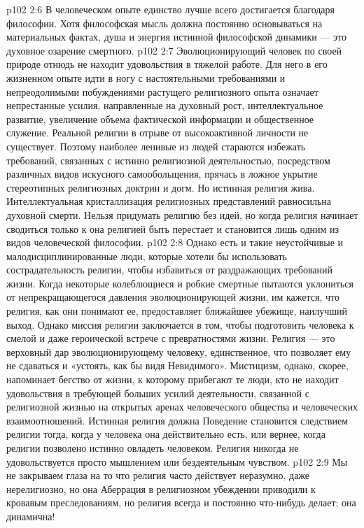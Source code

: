 \vs p102 2:6 В человеческом опыте единство лучше всего достигается благодаря философии. Хотя философская мысль должна постоянно основываться на материальных фактах, душа и энергия истинной философской динамики --- это духовное озарение смертного.
\vs p102 2:7 \pc Эволюционирующий человек по своей природе отнюдь не находит удовольствия в тяжелой работе. Для него в его жизненном опыте идти в ногу с настоятельными требованиями и непреодолимыми побуждениями растущего религиозного опыта означает непрестанные усилия, направленные на духовный рост, интеллектуальное развитие, увеличение объема фактической информации и общественное служение. Реальной религии в отрыве от высокоактивной личности не существует. Поэтому наиболее ленивые из людей стараются избежать требований, связанных с истинно религиозной деятельностью, посредством различных видов искусного самообольщения, прячась в ложное укрытие стереотипных религиозных доктрин и догм. Но истинная религия жива. Интеллектуальная кристаллизация религиозных представлений равносильна духовной смерти. Нельзя придумать религию без идей, но когда религия начинает сводиться только к  она религией быть перестает и становится лишь одним из видов человеческой философии.
\vs p102 2:8 Однако есть и такие неустойчивые и малодисциплинированные люди, которые хотели бы использовать сострадательность религии, чтобы избавиться от раздражающих требований жизни. Когда некоторые колеблющиеся и робкие смертные пытаются уклониться от непрекращающегося давления эволюционирующей жизни, им кажется, что религия, как они понимают ее, предоставляет ближайшее убежище, наилучший выход. Однако миссия религии заключается в том, чтобы подготовить человека к смелой и даже героической встрече с превратностями жизни. Религия --- это верховный дар эволюционирующему человеку, единственное, что позволяет ему не сдаваться и «устоять, как бы видя Невидимого». Мистицизм, однако, скорее, напоминает бегство от жизни, к которому прибегают те люди, кто не находит удовольствия в требующей больших усилий деятельности, связанной с религиозной жизнью на открытых аренах человеческого общества и человеческих взаимоотношений. Истинная религия должна  Поведение становится следствием религии тогда, когда у человека она действительно есть, или вернее, когда религии позволено истинно овладеть человеком. Религия никогда не удовольствуется просто мышлением или бездеятельным чувством.
\vs p102 2:9 Мы не закрываем глаза на то что религия часто действует неразумно, даже нерелигиозно, но она  Аберрация в религиозном убеждении приводили к кровавым преследованиям, но религия всегда и постоянно что\hyp{}нибудь делает; она динамична!

